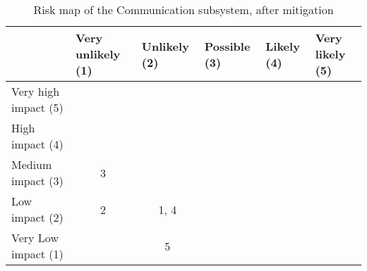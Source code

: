 \begin{table}[H]
\centering
\caption{Risk map of the Communication subsystem, after mitigation}
\label{tab:risk-map-com-mitig}\begin{tabular}{l|c|c|c|c|c|}
\cline{2-6}
& \multicolumn{1}{l|}{Very unlikely (1)} & \multicolumn{1}{l|}{Unlikely (2)} & \multicolumn{1}{l|}{Possible (3)} & \multicolumn{1}{l|}{Likely (4)} & \multicolumn{1}{l|}{Very likely (5)} \\ \hline
\multicolumn{1}{|l|}{Very high impact (5)} & \cellcolor{rm-3} & \cellcolor{rm-3} & \cellcolor{rm-3} & \cellcolor{rm-3} & \cellcolor{rm-3}\\ \hline 
\multicolumn{1}{|l|}{High impact (4)} & \cellcolor{rm-2} & \cellcolor{rm-2} & \cellcolor{rm-2} & \cellcolor{rm-3} & \cellcolor{rm-3}\\ \hline 
\multicolumn{1}{|l|}{Medium impact (3)} & \cellcolor{rm-0}3 & \cellcolor{rm-1} & \cellcolor{rm-1} & \cellcolor{rm-2} & \cellcolor{rm-3}\\ \hline 
\multicolumn{1}{|l|}{Low impact (2)} & \cellcolor{rm-0}2 & \cellcolor{rm-0}1, 4 & \cellcolor{rm-1} & \cellcolor{rm-2} & \cellcolor{rm-3}\\ \hline 
\multicolumn{1}{|l|}{Very Low impact (1)} & \cellcolor{rm-0} & \cellcolor{rm-0}5 & \cellcolor{rm-0} & \cellcolor{rm-2} & \cellcolor{rm-3}\\ \hline 
\end{tabular} 
\end{table}

